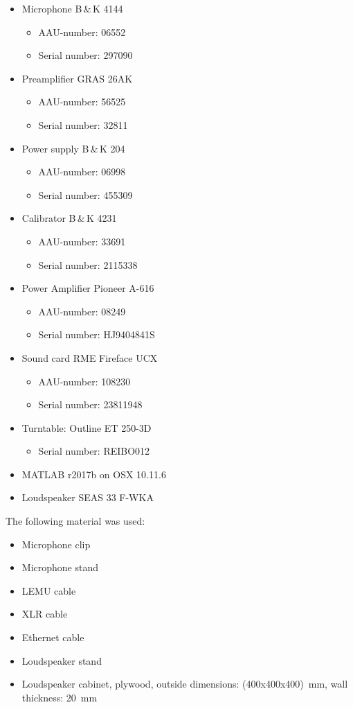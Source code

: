 \begin{itemize}[noitemsep]
\item Microphone B\,\&\,K 4144
\begin{itemize}[noitemsep]
\item AAU-number: 06552
\item Serial number: 297090
\end{itemize}
\item Preamplifier GRAS 26AK
\begin{itemize}[noitemsep]
\item AAU-number: 56525
\item Serial number: 32811
\end{itemize}
\item Power supply B\,\&\,K 204
\begin{itemize}
\item AAU-number: 06998
\item Serial number: 455309
\end{itemize}
\item Calibrator B\,\&\,K 4231
\begin{itemize}[noitemsep]
\item AAU-number: 33691
\item Serial number: 2115338
\end{itemize}
\item Power Amplifier Pioneer A-616
\begin{itemize}[noitemsep]
\item AAU-number: 08249
\item Serial number: HJ9404841S
\end{itemize}
\item Sound card RME Fireface UCX
\begin{itemize}[noitemsep]
\item AAU-number: 108230
\item Serial number: 23811948
\end{itemize}
\item Turntable: Outline ET 250-3D
\begin{itemize}
\item Serial number: REIBO012
\end{itemize}
\item MATLAB r2017b on OSX 10.11.6
\item Loudspeaker SEAS 33 F-WKA
\end{itemize}

The following material was used:
\begin{itemize}[noitemsep]
\item Microphone clip
\item Microphone stand
\item LEMU cable
\item XLR cable
\item Ethernet cable
\item Loudspeaker stand
\item Loudspeaker cabinet, plywood, outside dimensions: (400x400x400)\SI{}{\milli\meter}, wall thickness: \SI{20}{\milli\meter}
\end{itemize}

